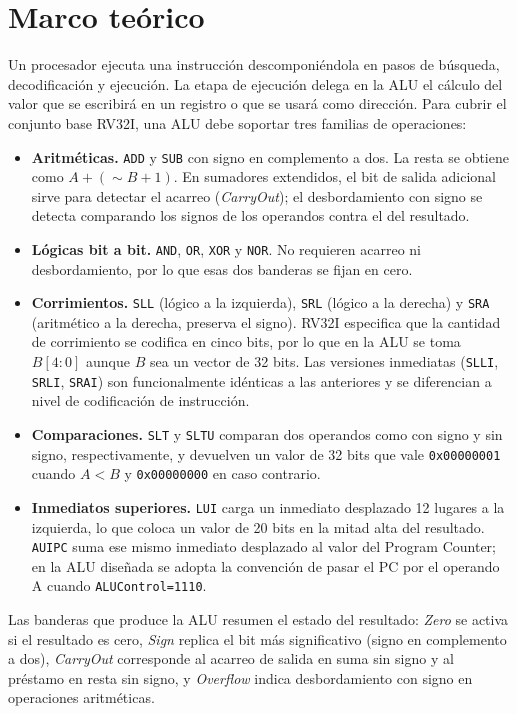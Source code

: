 \documentclass[12pt,letterpaper]{article}
\begin{document}
\section{Marco teórico}
Un procesador ejecuta una instrucción descomponiéndola en pasos de búsqueda, decodificación y ejecución. La etapa de ejecución delega en la ALU el cálculo del valor que se escribirá en un registro o que se usará como dirección. Para cubrir el conjunto base RV32I, una ALU debe soportar tres familias de operaciones:

\begin{itemize}
  \item \textbf{Aritméticas.} \texttt{ADD} y \texttt{SUB} con signo en complemento a dos. La resta se obtiene como $A + (\sim B + 1)$. En sumadores extendidos, el bit de salida adicional sirve para detectar el acarreo (\textit{CarryOut}); el desbordamiento con signo se detecta comparando los signos de los operandos contra el del resultado.
  \item \textbf{Lógicas bit a bit.} \texttt{AND}, \texttt{OR}, \texttt{XOR} y \texttt{NOR}. No requieren acarreo ni desbordamiento, por lo que esas dos banderas se fijan en cero.
  \item \textbf{Corrimientos.} \texttt{SLL} (lógico a la izquierda), \texttt{SRL} (lógico a la derecha) y \texttt{SRA} (aritmético a la derecha, preserva el signo). RV32I especifica que la cantidad de corrimiento se codifica en cinco bits, por lo que en la ALU se toma $B[4:0]$ aunque $B$ sea un vector de 32 bits. Las versiones inmediatas (\texttt{SLLI}, \texttt{SRLI}, \texttt{SRAI}) son funcionalmente idénticas a las anteriores y se diferencian a nivel de codificación de instrucción.
  \item \textbf{Comparaciones.} \texttt{SLT} y \texttt{SLTU} comparan dos operandos como con signo y sin signo, respectivamente, y devuelven un valor de 32 bits que vale \texttt{0x00000001} cuando $A < B$ y \texttt{0x00000000} en caso contrario.
  \item \textbf{Inmediatos superiores.} \texttt{LUI} carga un inmediato desplazado 12 lugares a la izquierda, lo que coloca un valor de 20 bits en la mitad alta del resultado. \texttt{AUIPC} suma ese mismo inmediato desplazado al valor del Program Counter; en la ALU diseñada se adopta la convención de pasar el PC por el operando A cuando \texttt{ALUControl=1110}.
\end{itemize}

Las banderas que produce la ALU resumen el estado del resultado: \textit{Zero} se activa si el resultado es cero, \textit{Sign} replica el bit más significativo (signo en complemento a dos), \textit{CarryOut} corresponde al acarreo de salida en suma sin signo y al préstamo en resta sin signo, y \textit{Overflow} indica desbordamiento con signo en operaciones aritméticas.
\end{document}
